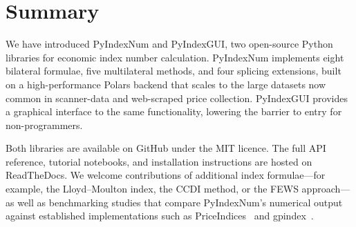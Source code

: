 \documentclass[12pt,a4paper]{article}
\begin{document}
\section{Summary}
\label{sec:summary}

We have introduced PyIndexNum and PyIndexGUI, two open-source Python libraries for economic index number calculation. PyIndexNum implements eight bilateral formulae, five multilateral methods, and four splicing extensions, built on a high-performance Polars backend that scales to the large datasets now common in scanner-data and web-scraped price collection. PyIndexGUI provides a graphical interface to the same functionality, lowering the barrier to entry for non-programmers.

Both libraries are available on GitHub under the MIT licence. The full API reference, tutorial notebooks, and installation instructions are hosted on ReadTheDocs. We welcome contributions of additional index formulae---for example, the Lloyd--Moulton index, the CCDI method, or the FEWS approach---as well as benchmarking studies that compare PyIndexNum's numerical output against established implementations such as PriceIndices~\autocite{bialek2021statistika} and gpindex~\autocite{martin2020gpindex}.

\printbibliography
\end{document}
